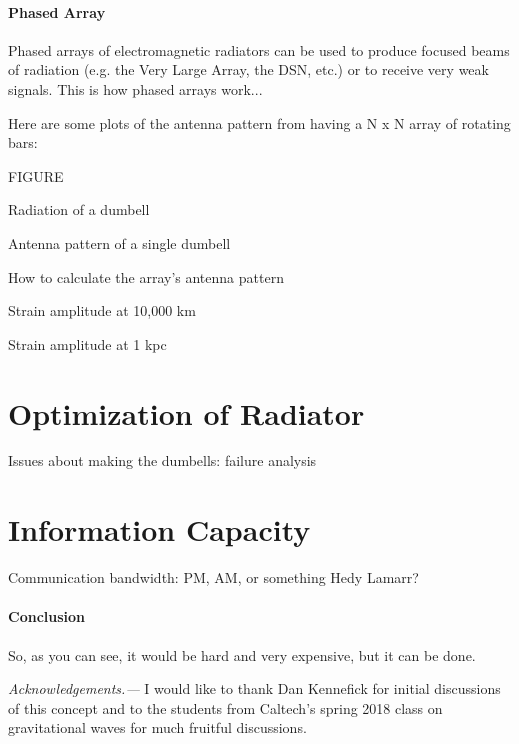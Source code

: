 \documentclass[aps,prd,twocolumn,showpacs,superscriptaddress,groupedaddress]{revtex4-2}  %
\begin{document}
\paragraph{Phased Array}
Phased arrays of electromagnetic radiators can be used to produce focused beams
of radiation (e.g. the Very Large Array, the DSN, etc.) or to receive very weak
signals.
This is how phased arrays work...

Here are some plots of the antenna pattern from having a N x N array of
rotating bars:

FIGURE

Radiation of a dumbell

Antenna pattern of a single dumbell

How to calculate the array's antenna pattern

Strain amplitude at 10,000 km

Strain amplitude at 1 kpc


\section{Optimization of Radiator}
Issues about making the dumbells: failure analysis


\section{Information Capacity}
Communication bandwidth: PM, AM, or something Hedy Lamarr?








\paragraph{Conclusion}
So, as you can see, it would be hard and very expensive, but it can be done.


{\it Acknowledgements.---}
I would like to thank Dan Kennefick for initial discussions of this
concept and to the students from Caltech's spring 2018 class on
gravitational waves for much fruitful discussions.


\end{document}
